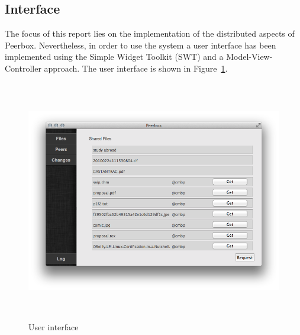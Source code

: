 \subsection{Interface}
The focus of this report lies on the implementation of the distributed aspects of Peerbox. Nevertheless, in order to use the system a user interface has been implemented using the Simple Widget Toolkit (SWT) and a Model-View-Controller approach. The user interface is shown in Figure~\ref{fig:figures_gui}.
\begin{figure}[htbp]
    \centering
        \includegraphics[height=4.15in]{figures/gui.png}
    \caption{User interface}
    \label{fig:figures_gui}
\end{figure}
